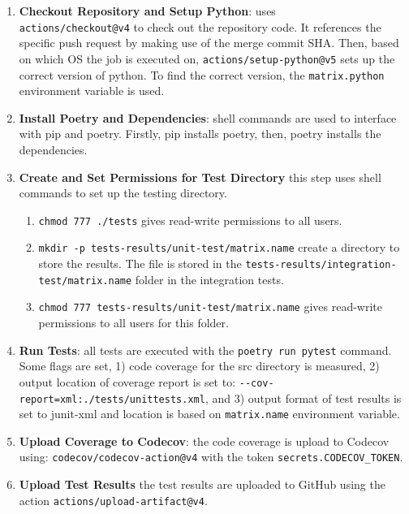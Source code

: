 \begin{enumerate}
    \item \textbf{Checkout Repository and Setup Python}: uses \\\verb|actions/checkout@v4| to check out the repository code. It references the specific push request by making use of the merge commit SHA. Then, based on which OS the job is executed on, \verb|actions/setup-python@v5| sets up the correct version of python. To find the correct version, the \verb|matrix.python| environment variable is used. 
    \item \textbf{Install Poetry and Dependencies}: shell commands are used to interface with pip and poetry. Firstly, pip installs poetry, then, poetry installs the dependencies. 
    \item \textbf{Create and Set Permissions for Test Directory} this step uses shell commands to set up the testing directory. 
    \begin{enumerate}
        \item \verb|chmod 777 ./tests| gives read-write permissions to all users. 
        \item \verb|mkdir -p tests-results/unit-test/matrix.name| create a directory to store the results. The file is stored in the \verb|tests-results/integration-test/matrix.name| folder in the integration tests. 
        \item \verb|chmod 777 tests-results/unit-test/matrix.name| gives read-write permissions to all users for this folder. 
    \end{enumerate}
    \item \textbf{Run Tests}: all tests are executed with the \verb|poetry run pytest| command. Some flags are set, 1) code coverage for the src directory is measured, 2) output location of coverage report is set to: \verb|--cov-report=xml:./tests/unittests.xml|, and 3) output format of test results is set to junit-xml and location is based on \verb|matrix.name| environment variable.  
    \item \textbf{Upload Coverage to Codecov}: the code coverage is upload to Codecov using: \verb|codecov/codecov-action@v4| with the token \verb|secrets.CODECOV_TOKEN|.
    \item \textbf{Upload Test Results} the test results are uploaded to GitHub using the action \verb|actions/upload-artifact@v4|. 
\end{enumerate}
